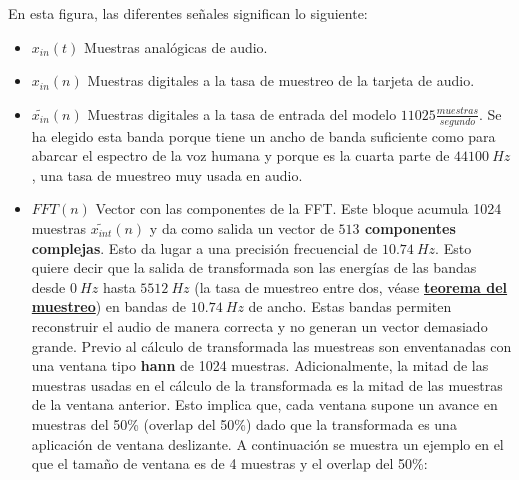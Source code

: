 En esta figura, las diferentes señales significan lo siguiente:
\begin{itemize}
	\item $x_{in}(t)$ Muestras analógicas de audio.
	\item $x_{in}(n)$ Muestras digitales a la tasa de muestreo de la tarjeta de audio.
 	\item $\widetilde{x_{in}}(n)$ Muestras digitales a la tasa de entrada del modelo $11025\frac{muestras}{segundo}$. Se ha elegido esta banda porque tiene un ancho de banda suficiente como para abarcar el espectro de la voz humana y porque es la cuarta parte de $44100~Hz$, una tasa de muestreo muy usada en audio.
 	\item $FFT(n)$ Vector con las componentes de la \gls{FFT}. Este bloque acumula 1024 muestras $\widetilde{x_{int}}(n)$ y da como salida un vector de \textbf{$513$ componentes complejas}. Esto da lugar a una precisión frecuencial de $10.74~Hz$. Esto quiere decir que la salida de transformada son las energías de las bandas desde $0~Hz$ hasta $5512~Hz$ (la tasa de muestreo entre dos, véase \hyperref[subsec: nyquist]{\textbf{teorema del muestreo}}) en bandas de $10.74~Hz$ de ancho. Estas bandas permiten reconstruir el audio de manera correcta y no generan un vector demasiado grande. Previo al cálculo de transformada las muestreas son enventanadas con una ventana tipo \textbf{hann} de 1024 muestras. Adicionalmente, la mitad de las muestras usadas en el cálculo de la transformada es la mitad de las muestras de la ventana anterior. Esto implica que, cada ventana supone un avance en muestras del 50\% (overlap del 50\%) dado que la transformada es una aplicación de ventana deslizante. A continuación se muestra un ejemplo en el que el tamaño de ventana es de 4 muestras y el overlap del 50\%:
 	\enlargethispage{0.5in}
 	\begin{center}
	 	\vspace*{5pt}
\end{center}
\end{itemize}
